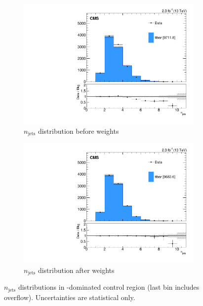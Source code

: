 \begin{figure}
\begin{center}
	\begin{subfigure}[b]{.7\textwidth}
		\includegraphics[width=\textwidth]{Background/bkg_tt/ttbar_NGOODJETS_STgt300_beforeWeights}
		\caption{$n_\textrm{jets}$ distribution before weights}
	\end{subfigure}
	\begin{subfigure}[b]{.7\textwidth}
		\includegraphics[width=\textwidth]{Background/bkg_tt/ttbar_NGOODJETS_STgt300_afterWeights}
		\caption{$n_\textrm{jets}$ distribution after weights}
	\end{subfigure}
	\caption{$n_\textrm{jets}$ distributions in \ttbar-dominated control region (last bin includes overflow). Uncertainties are statistical only.
	\label{fig:tt/NGOODJETS}}
\end{center}
\end{figure}

